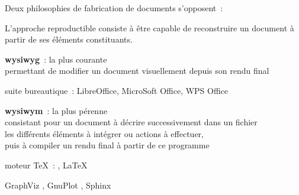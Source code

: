 Deux philosophies de fabrication de documents s’opposent :

L’approche reproductible consiste à être capable de reconstruire un document
à partir de ses éléments constituants.

\begin{itmz}
\item{\textbf{\gls{wysiwyg}} : la plus courante\\
permettant de modifier un document visuellement depuis son rendu final
    \begin{itmz}
    \item{suite bureautique : LibreOffice, MicroSoft Office, WPS Office}
    \end{itmz}
}
\item{\textbf{\gls{wysiwym}} : la plus pérenne\\
consistant pour un document à décrire successivement dans un fichier\\
les différents éléments à intégrer ou actions à effectuer,\\
puis à compiler un rendu final à partir de ce programme
    \begin{itmz}
    \item{moteur \TeX : \XeLaTeX, \LaTeX \cite{latex}}
    \item{GraphViz \cite{graphviz}, GnuPlot \cite{gnuplot}, Sphinx \cite{sphinx}}
    \end{itmz}
}
\end{itmz}

\pagebreak
